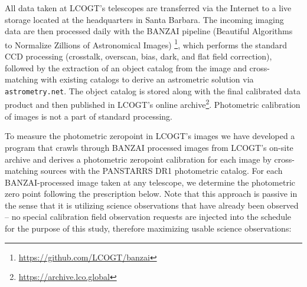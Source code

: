 \documentclass[]{spie}
\begin{document}
All data taken at LCOGT's telescopes are transferred via the Internet to a live storage located at
the headquarters in Santa Barbara. The incoming imaging data are then processed daily with the BANZAI
pipeline (Beautiful Algorithms to Normalize Zillions of Astronomical Images)
\cite{mccully2018}\footnote{\url{https://github.com/LCOGT/banzai}}, which  performs the standard
CCD processing (crosstalk, overscan, bias, dark, and flat field correction), followed by the
extraction of an object catalog from the image and cross-matching with existing catalogs to derive an
astrometric solution via {\tt astrometry.net}\cite{lang2010}. The object catalog is stored along
with the final calibrated data product and then published in LCOGT's online
archive\footnote{\url{https://archive.lco.global}}. Photometric calibration of images is not a part
of standard processing.

To measure the photometric zeropoint in LCOGT's images we have developed a program that crawls
through BANZAI processed images from LCOGT's on-site archive and derives a photometric zeropoint
calibration for each image by cross-matching sources with the PANSTARRS DR1 photometric
catalog\cite{chambers2016}. For each BANZAI-processed image taken at any telescope, we determine the
photometric zero point following the prescription below. Note that this approach is passive in the
sense that it is utilizing science observations that have already been observed -- no special
calibration field observation requests are injected into the schedule for the purpose of this
study, therefore maximizing usable science observations:
\end{document}
